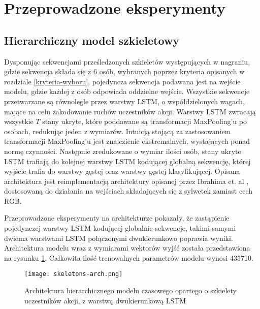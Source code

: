 \newpage
\section{Przeprowadzone eksperymenty}

\subsection{Hierarchiczny model szkieletowy}
Dysponując sekwencjami prześledzonych szkieletów występujących w nagraniu, gdzie sekwencja składa się z 6 osób, wybranych poprzez kryteria opisanych w rozdziale \ref{kryteria-wyboru}, pojedyncza sekwencja podawana jest na wejście modelu, gdzie każdej z osób odpowiada oddzielne wejście. Wszystkie sekwencje przetwarzane są równolegle przez warstwy LSTM, o współdzielonych wagach, mające na celu zakodowanie ruchów uczestników akcji. Warstwy LSTM zwracają wszystkie $T$ stany ukryte, które poddawane są transformacji MaxPooling'u po osobach, redukując jeden z wymiarów. Intuicją stojącą za zastosowaniem transformacji MaxPooling'u jest znalezienie ekstremalnych, wystających ponad normę czynności. Następnie zredukowane o wymiar ilości osób, stany ukryte LSTM trafiają do kolejnej warstwy LSTM kodującej globalną sekwencję, której wyjście trafia do warstwy gęstej oraz warstwy gęstej klasyfikującej. Opisana architektura jest reimplementacją architektury opisanej przez Ibrahima et. al \cite{Ibrahim2015}, dostosowaną do działania na wejściach składających się z sylwetek zamiast cech RGB. 

Przeprowadzone eksperymenty na architekturze pokazały, że zastąpienie pojedynczej warstwy LSTM kodującej globalnie sekwencje, takimi samymi dwiema warstwami LSTM połączonymi dwukierunkowo poprawia wyniki. Architektura modelu wraz z wymiarami wektorów wyjść została przedstawiona na rysunku \ref{fig:skeletons-arch}. Całkowita ilość trenowalnych parametrów modelu wynosi 435710. 
\begin{figure}[!h]
    \centering \texttt{[image: skeletons-arch.png]}
    \caption{Architektura hierarchicznego modelu czasowego opartego o szkielety uczestników akcji, z warstwą dwukierunkową LSTM}
    \label{fig:skeletons-arch}
\end{figure}

